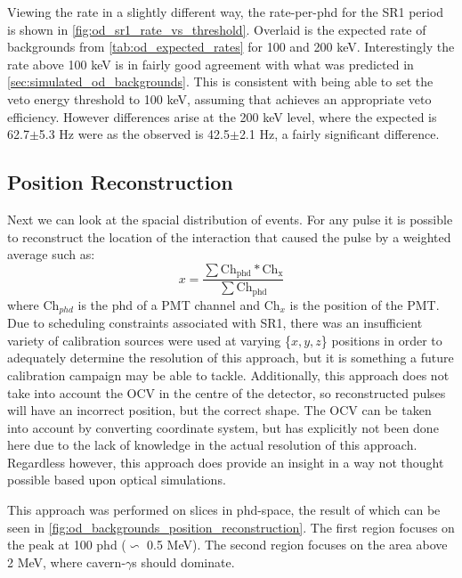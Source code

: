 

\par
Viewing the rate in a slightly different way, the rate-per-phd for the SR1 period is shown in \autoref{fig:od_sr1_rate_vs_threshold}.
Overlaid is the expected rate of backgrounds from \autoref{tab:od_expected_rates} for 100 and 200 keV.
Interestingly the rate above 100 keV is in fairly good agreement with what was predicted in \autoref{sec:simulated_od_backgrounds}.
This is consistent with being able to set the veto energy threshold to 100 keV, assuming that achieves an appropriate veto efficiency.
However differences arise at the 200 keV level, where the expected is 62.7$\pm$5.3 Hz were as the observed is 42.5$\pm$2.1 Hz, a fairly significant difference.



\subsection{Position Reconstruction}
\par
Next we can look at the spacial distribution of events.
For any pulse it is possible to reconstruct the location of the interaction that caused the pulse by a weighted average such as:
\begin{equation}
    x = \frac{\sum{\text{Ch}_{\text{phd}} * \text{Ch}_\text{x}}}{\sum{\text{Ch}_\text{phd}}} 
\label{eq:OD_xy_position}
\end{equation}
where Ch$_{phd}$ is the phd of a PMT channel and Ch$_{x}$ is the position of the PMT.
Due to scheduling constraints associated with SR1, there was an insufficient variety of calibration sources were used at varying \{$x,y,z$\} positions in order to adequately determine the resolution of this approach, but it is something a future calibration campaign may be able to tackle. 
Additionally, this approach does not take into account the OCV in the centre of the detector, so reconstructed pulses will have an incorrect position, but the correct shape.
The OCV can be taken into account by converting coordinate system, but has explicitly not been done here due to the lack of knowledge in the actual resolution of this approach.
Regardless however, this approach does provide an insight in a way not thought possible based upon optical simulations.

\par
This approach was performed on slices in phd-space, the result of which can be seen in \autoref{fig:od_backgrounds_position_reconstruction}.
The first region focuses on the peak at 100 phd ($\backsim$ 0.5 MeV).
The second region focuses on the area above 2 MeV, where cavern-$\gamma$s should dominate.

